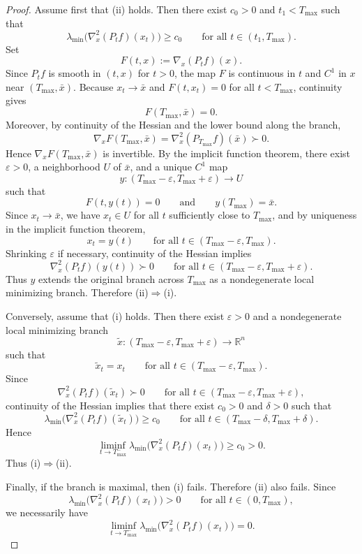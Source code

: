 \documentclass[10pt,a4paper]{amsart}
\begin{document}
\begin{proof}
Assume first that (ii) holds. Then there exist $c_0>0$ and $t_1<T_{\max}$ such that
$$
\lambda_{\min}\bigl(\nabla_x^2(P_t f)(x_t)\bigr)\ge c_0
\qquad\text{for all }t\in(t_1,T_{\max}).
$$
Set
$$
F(t,x):=\nabla_x(P_t f)(x).
$$
Since $P_t f$ is smooth in $(t,x)$ for $t>0$, the map $F$ is continuous in $t$ and $C^1$ in $x$ near $(T_{\max},\bar x)$. Because $x_t\to\bar x$ and $F(t,x_t)=0$ for all $t<T_{\max}$, continuity gives
$$
F(T_{\max},\bar x)=0.
$$
Moreover, by continuity of the Hessian and the lower bound along the branch,
$$
\nabla_xF(T_{\max},\bar x)=\nabla_x^2(P_{T_{\max}}f)(\bar x)\succ 0.
$$
Hence $\nabla_xF(T_{\max},\bar x)$ is invertible. By the implicit function theorem, there exist $\varepsilon>0$, a neighborhood $U$ of $\bar x$, and a unique $C^1$ map
$$
y:(T_{\max}-\varepsilon,T_{\max}+\varepsilon)\to U
$$
such that
$$
F(t,y(t))=0
\qquad\text{and}\qquad
y(T_{\max})=\bar x.
$$
Since $x_t\to\bar x$, we have $x_t\in U$ for all $t$ sufficiently close to $T_{\max}$, and by uniqueness in the implicit function theorem,
$$
x_t=y(t)
\qquad\text{for all }t\in(T_{\max}-\varepsilon,T_{\max}).
$$
Shrinking $\varepsilon$ if necessary, continuity of the Hessian implies
$$
\nabla_x^2(P_t f)(y(t))\succ 0
\qquad\text{for all }t\in(T_{\max}-\varepsilon,T_{\max}+\varepsilon).
$$
Thus $y$ extends the original branch across $T_{\max}$ as a nondegenerate local minimizing branch. Therefore (ii)$\Rightarrow$(i).

Conversely, assume that (i) holds. Then there exist $\varepsilon>0$ and a nondegenerate local minimizing branch
$$
\widetilde x:(T_{\max}-\varepsilon,T_{\max}+\varepsilon)\to\mathbb R^n
$$
such that
$$
\widetilde x_t=x_t
\qquad\text{for all }t\in(T_{\max}-\varepsilon,T_{\max}).
$$
Since
$$
\nabla_x^2(P_t f)(\widetilde x_t)\succ 0
\qquad\text{for all }t\in(T_{\max}-\varepsilon,T_{\max}+\varepsilon),
$$
continuity of the Hessian implies that there exist $c_0>0$ and $\delta>0$ such that
$$
\lambda_{\min}\bigl(\nabla_x^2(P_t f)(\widetilde x_t)\bigr)\ge c_0
\qquad\text{for all }t\in(T_{\max}-\delta,T_{\max}+\delta).
$$
Hence
$$
\liminf_{t\to T_{\max}^-}\lambda_{\min}\bigl(\nabla_x^2(P_t f)(x_t)\bigr)\ge c_0>0.
$$
Thus (i)$\Rightarrow$(ii).

Finally, if the branch is maximal, then (i) fails. Therefore (ii) also fails. Since
$$
\lambda_{\min}\bigl(\nabla_x^2(P_t f)(x_t)\bigr)>0
\qquad\text{for all }t\in(0,T_{\max}),
$$
we necessarily have
$$
\liminf_{t\to T_{\max}^-}\lambda_{\min}\bigl(\nabla_x^2(P_t f)(x_t)\bigr)=0.
$$
\end{proof}
\end{document}
